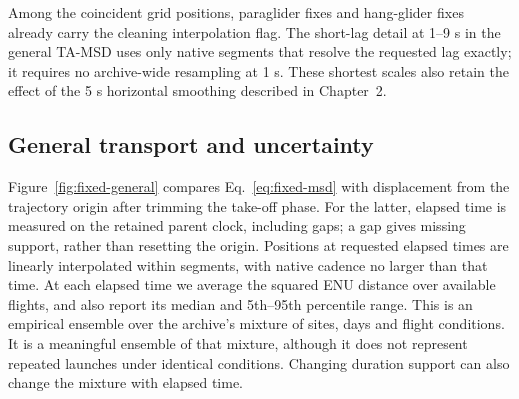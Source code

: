\begin{table}[htbp]
 \centering\small
 
 \caption{Common-grid positions in the main fixed cohort. Coincidence is checked
 against actual cleaned timestamps. The last two columns count interpolation added
 by the 10 s grid, separately from reconstruction during cleaning.}
 \label{tab:fixed-interpolation}
\end{table}
Among the coincident grid positions, \ChThreeParaPriorInterp{} paraglider fixes and
\ChThreeHangPriorInterp{} hang-glider fixes already carry the cleaning interpolation
flag. The short-lag detail at 1--9 s in the general TA-MSD uses only native segments that
resolve the requested lag exactly; it requires no archive-wide resampling at 1 s.
These shortest scales also retain the effect of the 5 s horizontal smoothing described
in Chapter~2.

\subsection{General transport and uncertainty}
\label{sec:fixed-general}

Figure~\ref{fig:fixed-general} compares Eq.~\eqref{eq:fixed-msd} with displacement
from the trajectory origin after trimming the take-off phase. For the latter, elapsed
time is measured on the retained parent clock, including gaps; a gap gives missing
support, rather than resetting the origin. Positions at requested elapsed times are
linearly interpolated within segments, with native cadence no larger than that time.
At each elapsed time we average the squared
ENU distance over available flights, and also report its median and 5th--95th percentile
range. This is an empirical ensemble over the archive's mixture of sites, days and
flight conditions. It is a meaningful ensemble of that mixture, although it does not
represent repeated launches under identical conditions. Changing duration support can
also change the mixture with elapsed time.

